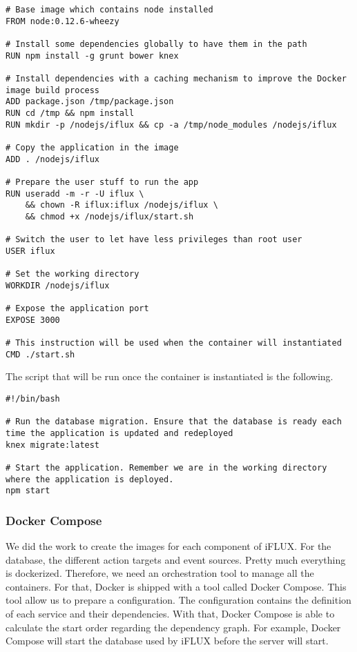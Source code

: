 \begin{lstlisting}
# Base image which contains node installed
FROM node:0.12.6-wheezy

# Install some dependencies globally to have them in the path
RUN npm install -g grunt bower knex

# Install dependencies with a caching mechanism to improve the Docker image build process
ADD package.json /tmp/package.json
RUN cd /tmp && npm install
RUN mkdir -p /nodejs/iflux && cp -a /tmp/node_modules /nodejs/iflux

# Copy the application in the image
ADD . /nodejs/iflux

# Prepare the user stuff to run the app
RUN useradd -m -r -U iflux \
	&& chown -R iflux:iflux /nodejs/iflux \
	&& chmod +x /nodejs/iflux/start.sh

# Switch the user to let have less privileges than root user
USER iflux

# Set the working directory
WORKDIR /nodejs/iflux

# Expose the application port
EXPOSE 3000

# This instruction will be used when the container will instantiated
CMD ./start.sh
\end{lstlisting}

The script that will be run once the container is instantiated is the following.

\begin{lstlisting}
#!/bin/bash

# Run the database migration. Ensure that the database is ready each time the application is updated and redeployed
knex migrate:latest

# Start the application. Remember we are in the working directory where the application is deployed.
npm start
\end{lstlisting}

\subsubsection{Docker Compose}

We did the work to create the images for each component of iFLUX. For the database, the different action targets and event sources. Pretty much everything is dockerized. Therefore, we need an orchestration tool to manage all the containers. For that, Docker is shipped with a tool called Docker Compose. This tool allow us to prepare a configuration. The configuration contains the definition of each service and their dependencies. With that, Docker Compose is able to calculate the start order regarding the dependency graph. For example, Docker Compose will start the database used by iFLUX before the server will start.

